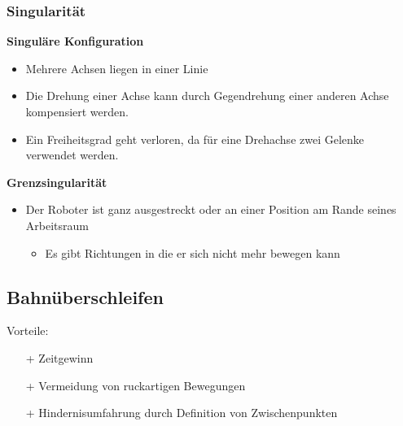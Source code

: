 \subsubsection{Singularität}
\begin{minipage}{0.5\linewidth}
    \textbf{Singuläre Konfiguration}
    \begin{itemize}
        \item Mehrere Achsen liegen in einer Linie
        \item Die Drehung einer Achse kann durch Gegendrehung einer anderen Achse kompensiert werden.
        \item Ein Freiheitsgrad geht verloren, da für eine Drehachse zwei Gelenke verwendet werden.
    \end{itemize}
\end{minipage}
\begin{minipage}{0.5\linewidth}
    \textbf{Grenzsingularität}\newline
    \begin{itemize}
        \item Der Roboter ist ganz ausgestreckt oder an einer Position am Rande seines Arbeitsraum
        \begin{itemize}
            \item Es gibt Richtungen in die er sich nicht mehr bewegen kann
        \end{itemize}
    \end{itemize}
\end{minipage}

\subsection{Bahnüberschleifen }
Vorteile:
\begin{itemize}
    \item[+] Zeitgewinn
    \item[+] Vermeidung von ruckartigen Bewegungen
    \item[+] Hindernisumfahrung durch Definition von Zwischenpunkten 
\end{itemize}

